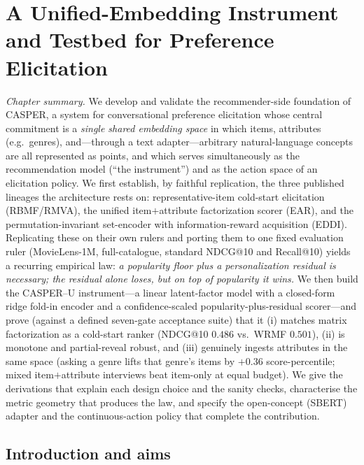 \providecommand{\R}{\mathbb{R}}
\providecommand{\Q}{\mathbf{Q}}
\providecommand{\X}{\mathbf{X}}
\providecommand{\uu}{\mathbf{u}}
\providecommand{\yy}{\mathbf{y}}
\providecommand{\AA}{\mathbf{A}}
\providecommand{\W}{\mathbf{W}}
\providecommand{\I}{\mathbf{I}}

\chapter{A Unified-Embedding Instrument and Testbed for Preference Elicitation}\label{ch:testbed}

\textit{Chapter summary.} We develop and validate the recommender-side foundation of CASPER, a system for conversational
preference elicitation whose central commitment is a \emph{single shared embedding space} in which items,
attributes (e.g.\ genres), and---through a text adapter---arbitrary natural-language concepts are all
represented as points, and which serves simultaneously as the recommendation model (``the instrument'') and as
the action space of an elicitation policy. We first establish, by faithful replication, the three published
lineages the architecture rests on: representative-item cold-start elicitation (RBMF/RMVA), the unified
item$+$attribute factorization scorer (EAR), and the permutation-invariant set-encoder with information-reward
acquisition (EDDI). Replicating these on their own rulers and porting them to one fixed evaluation ruler
(MovieLens-1M, full-catalogue, standard NDCG@10 and Recall@10) yields a recurring empirical law: \emph{a
popularity floor plus a personalization residual is necessary; the residual alone loses, but on top of
popularity it wins.} We then build the CASPER--U instrument---a linear latent-factor model with a closed-form
ridge fold-in encoder and a confidence-scaled popularity-plus-residual scorer---and prove (against a defined
seven-gate acceptance suite) that it (i) matches matrix factorization as a cold-start ranker
(NDCG@10 $0.486$ vs.\ WRMF $0.501$), (ii) is monotone and partial-reveal robust, and (iii) genuinely ingests
attributes in the same space (asking a genre lifts that genre's items by $+0.36$ score-percentile; mixed
item$+$attribute interviews beat item-only at equal budget). We give the derivations that explain each design
choice and the sanity checks, characterise the metric geometry that produces the law, and specify the
open-concept (SBERT) adapter and the continuous-action policy that complete the contribution.


\section{Introduction and aims}

